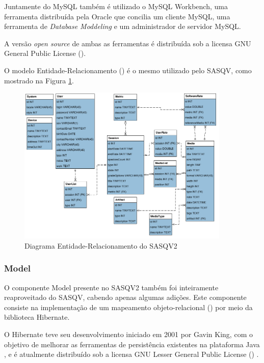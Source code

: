Juntamente do MySQL também é utilizado o MySQL Workbench, uma ferramenta distribuída pela Oracle que concilia um cliente MySQL, uma ferramenta de \emph{Database Moddeling} e um administrador de servidor MySQL.

A versão \emph{open source} de ambas as ferramentas é distribuída sob a licensa GNU General Public License ().

O modelo Entidade-Relacionamento () é o mesmo utilizado pelo SASQV, como mostrado na Figura \ref{fig:diagramaER}.

\begin{figure}[!htb]
	\centering
	\includegraphics[width=0.9\textwidth]{./imgs/diagramaER.png}
	\caption{Diagrama Entidade-Relacionamento do SASQV2}
	\label{fig:diagramaER}
\end{figure}

\subsubsection{Model}

O componente Model presente no SASQV2 também foi inteiramente reaproveitado do SASQV, cabendo apenas algumas adições. Este componente consiste na implementação de um mapeamento objeto-relacional () por meio da biblioteca Hibernate.

O Hibernate teve seu desenvolvimento iniciado em 2001 por Gavin King, com o objetivo de melhorar as ferramentas de persistência existentes na plataforma Java \cite{hibernateHistory}, e é atualmente distribuído sob a licensa GNU Lesser General Public License () \cite{hibernateAbout}.

